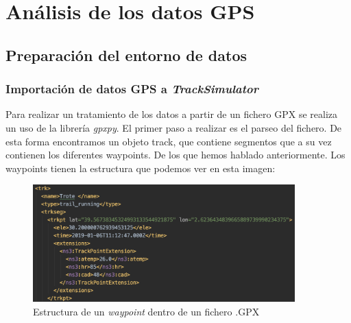 \chapter{Análisis de los datos \ac{GPS}} 
\section{Preparación del entorno de datos}
\subsection{Importación de datos GPS a \textit{TrackSimulator}}
\label{section: ImportacionGPX}
Para realizar un tratamiento de los datos a partir de un fichero GPX se realiza un uso de la 
librería \textit{gpxpy}. El primer paso a realizar es el parseo del fichero. De esta forma 
encontramos un objeto track, que contiene segmentos que a su vez contienen los diferentes 
waypoints. De los que hemos hablado anteriormente.
Los waypoints tienen la estructura que podemos ver en esta imagen:

\begin{figure}[htb]
\begin{center}
\includegraphics[width=0.9\textwidth]{./Imagenes/WayPointStructure.png}
\caption{Estructura de un \textit{waypoint} dentro de un fichero .\ac{GPX}}
\label{WayPointStructure}
\end{center}
\end{figure}


